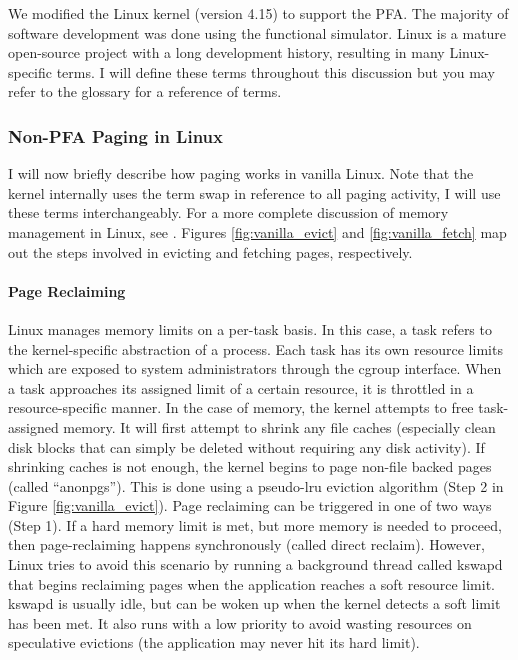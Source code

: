 We modified the Linux kernel (version 4.15\cite{linux}) to support the PFA. The
majority of software development was done using the functional simulator. Linux
is a mature open-source project with a long development history, resulting in
many Linux-specific terms. I will define these terms throughout this discussion
but you may refer to the glossary for a reference of terms.

\subsubsection{Non-PFA Paging in Linux} \label{sec:vanillaLinux}
I will now briefly describe how paging works in vanilla Linux. Note that the
kernel internally uses the term \gls{swap} in reference to all paging activity,
I will use these terms interchangeably. For a more complete discussion of
memory management in Linux, see \cite{linuxBook}. Figures
\ref{fig:vanilla_evict} and \ref{fig:vanilla_fetch} map out the steps involved
in evicting and fetching pages, respectively.

\paragraph{Page Reclaiming}
Linux manages memory limits on a per-task basis. In this case, a \gls{task}
refers to the kernel-specific abstraction of a process. Each task has its own
resource limits which are exposed to system administrators through the
\gls{cgroup} interface. When a task approaches its assigned limit of a certain
resource, it is throttled in a resource-specific manner. In the case of memory,
the kernel attempts to free task-assigned memory. It will first attempt to
shrink any file caches (especially clean disk blocks that can simply be deleted
without requiring any disk activity). If shrinking caches is not enough, the
kernel begins to page non-file backed pages (called ``\glspl{anonpg}''). This
is done using a pseudo-\gls{lru} eviction algorithm (Step 2 in Figure
\ref{fig:vanilla_evict}). Page reclaiming can be triggered
in one of two ways (Step 1). If a hard memory limit is met, but more memory is needed to
proceed, then page-reclaiming happens synchronously (called direct reclaim).
However, Linux tries to avoid this scenario by running a background thread
called \gls{kswapd} that begins reclaiming pages when the application reaches a
soft resource limit. \Gls{kswapd} is usually idle, but can be woken up when the
kernel detects a soft limit has been met. It also runs with a low priority to
avoid wasting resources on speculative evictions (the application may never hit
its hard limit).

